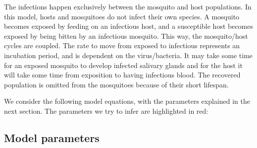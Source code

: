 \documentclass{article}
\begin{document}
The infections happen exclusively between the mosquito and host populations. In this model, hosts 
and mosquitoes do not infect their own species. A mosquito becomes exposed by feeding on an infectious 
host, and a susceptible host becomes exposed by being bitten by an infectious mosquito. This way, 
the mosquito/host cycles are coupled. The rate to move from exposed to infectious represents an 
incubation period, and is dependent on the virus/bacteria. It may take some time for an exposed 
mosquito to develop infected salivary glands and for the host it will take some time from exposition 
to having infectious blood. The recovered population is omitted from the mosquitoes because of their 
short lifespan.

We consider the following model equations, with the parameters explained in the next section.
The parameters we try to infer are highlighted in red:




\subsection{Model parameters}
\end{document}
